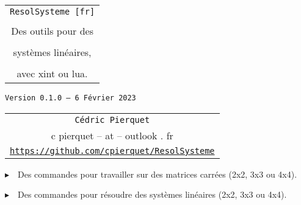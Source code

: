 \documentclass[a4paper,11pt]{article}
\def\TPversion{0.1.0}
\def\TPdate{6 Février 2023}
\begin{document}
\setlength{\aweboxleftmargin}{0.07\linewidth}
\setlength{\aweboxcontentwidth}{0.93\linewidth}
\setlength{\aweboxvskip}{8pt}

\pagestyle{fancy}

\thispagestyle{empty}

\vspace{2cm}

\begin{center}
	\begin{minipage}{0.75\linewidth}
	\begin{tcolorbox}[colframe=yellow,colback=yellow!15]
		\begin{center}
			\begin{tabular}{c}
				{\Huge \texttt{ResolSysteme [fr]}}\\
				\\
				{\LARGE Des outils pour des} \\
				\\
				{\LARGE systèmes linéaires,} \\
				\\
				{\LARGE avec xint ou lua.} \\
			\end{tabular}
			
			\bigskip
			
			{\small \texttt{Version \TPversion{} -- \TPdate}}
		\end{center}
	\end{tcolorbox}
\end{minipage}
\end{center}

\vspace{0.5cm}

\begin{center}
	\begin{tabular}{c}
	\texttt{Cédric Pierquet}\\
	{\ttfamily c pierquet -- at -- outlook . fr}\\
	\texttt{\url{https://github.com/cpierquet/ResolSysteme}}
\end{tabular}
\end{center}

\vspace{0.25cm}

{$\blacktriangleright$~~Des commandes pour travailler sur des matrices carrées (2x2, 3x3 ou 4x4).}

\smallskip

{$\blacktriangleright$~~Des commandes pour résoudre des systèmes linéaires (2x2, 3x3 ou 4x4).}
\end{document}
